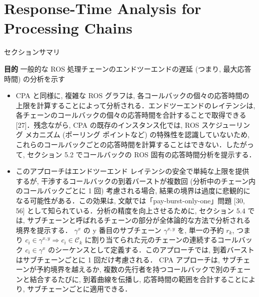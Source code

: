 
\section{Response-Time Analysis for Processing Chains}
\label{sec: response-time analysis for processing chains}

\begin{frame}{セクションサマリ}
    \begin{itembox}[l]{\textbf{目的}}
        一般的な ROS 処理チェーンのエンドツーエンドの遅延 (つまり, 最大応答時間) の分析を示す
    \end{itembox}
\end{frame}

\begin{frame}{}
    \begin{itemize}
        \item CPA と同様に, 複雑な ROS グラフは, 各コールバックの個々の応答時間の上限を計算することによって分析される．エンドツーエンドのレイテンシは, 各チェーンのコールバックの個々の応答時間を合計することで取得できる [27]．残念ながら, CPA の既存のインスタンス化では, ROS スケジューリング メカニズム (ポーリング ポイントなど) の特殊性を認識していないため, これらのコールバックごとの応答時間を計算することはできない．したがって, セクション 5.2 でコールバックの ROS 固有の応答時間分析を提示する．
    \end{itemize}
\end{frame}

\begin{frame}{}
    \begin{itemize}
        \item このアプローチはエンドツーエンド レイテンシの安全で単純な上限を提供するが, 干渉するコールバックの到着バーストが複数回 (分析中のチェーン内のコールバックごとに 1 回) 考慮される場合, 結果の境界は過度に悲観的になる可能性がある．この効果は, 文献では「pay-burst-only-one」問題 [30, 56] として知られている．分析の精度を向上させるために, セクション $5.4$ では, サブチェーンと呼ばれるチェーンの部分が全体論的な方法で分析される境界を提示する． $\gamma^{x}$ の y 番目のサブチェーン $\gamma^{x, y}$ を, 単一の予約 $r_{k}$, つまり $c_{i} \in \gamma^{x, y} \Rightarrow c_{i} \in \mathcal{C}_{k}$ に割り当てられた元のチェーンの連続するコールバック $c_{i} \in \gamma^{x}$ のシーケンスとして定義する．このアプローチでは, 到着バーストはサブチェーンごとに 1 回だけ考慮される． CPA アプローチは, サブチェーンが予約境界を越えるか, 複数の先行者を持つコールバックで別のチェーンと結合するたびに, 到着曲線を伝播し, 応答時間の範囲を合計することにより, サブチェーンごとに適用できる．
    \end{itemize}
\end{frame}


